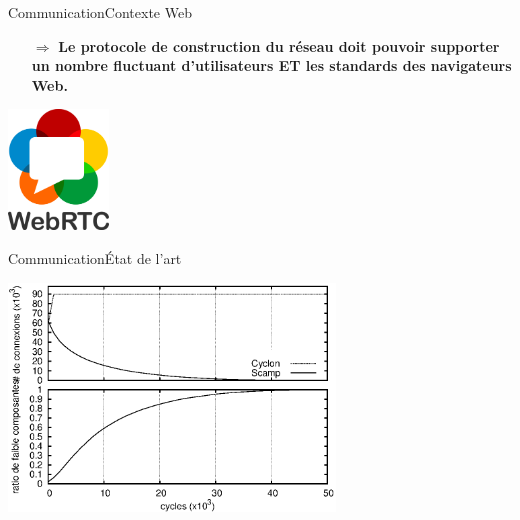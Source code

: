 \begin{frame}{Communication}{Contexte Web}
 
  \large
  \begin{itemize}
  \item [$\Rightarrow$] \textbf{Le protocole de construction du réseau doit
      pouvoir supporter un nombre fluctuant d'utilisateurs ET les standards des
      navigateurs Web.}
  \end{itemize}

  \vspace{1cm}

  \begin{center}
    \includegraphics[width=0.2\textwidth]{img/webrtc.png}
  \end{center}


\end{frame}

\begin{frame}{Communication}{État de l'art}

  \begin{center}
    \begin{table}[H]
      
    \end{table}
  \end{center}
    \begin{center}
      \includegraphics[width=0.65\textwidth]{img/network/motivation.eps}
    \end{center}

\end{frame}


